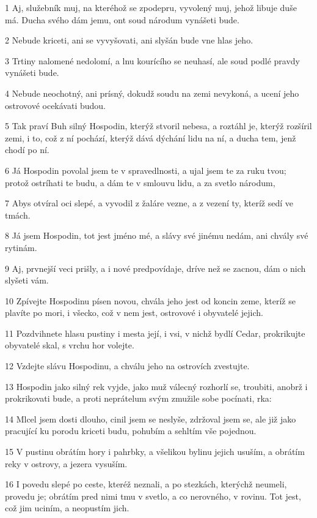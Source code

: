 \par 1 Aj, služebník muj, na kteréhož se zpodepru, vyvolený muj, jehož libuje duše má. Ducha svého dám jemu, ont soud národum vynášeti bude.
\par 2 Nebude kriceti, ani se vyvyšovati, ani slyšán bude vne hlas jeho.
\par 3 Trtiny nalomené nedolomí, a lnu kourícího se neuhasí, ale soud podlé pravdy vynášeti bude.
\par 4 Nebude neochotný, ani prísný, dokudž soudu na zemi nevykoná, a ucení jeho ostrovové ocekávati budou.
\par 5 Tak praví Buh silný Hospodin, kterýž stvoril nebesa, a roztáhl je, kterýž rozšíril zemi, i to, což z ní pochází, kterýž dává dýchání lidu na ní, a ducha tem, jenž chodí po ní.
\par 6 Já Hospodin povolal jsem te v spravedlnosti, a ujal jsem te za ruku tvou; protož ostríhati te budu, a dám te v smlouvu lidu, a za svetlo národum,
\par 7 Abys otvíral oci slepé, a vyvodil z žaláre vezne, a z vezení ty, kteríž sedí ve tmách.
\par 8 Já jsem Hospodin, tot jest jméno mé, a slávy své jinému nedám, ani chvály své rytinám.
\par 9 Aj, prvnejší veci prišly, a i nové predpovídaje, dríve než se zacnou, dám o nich slyšeti vám.
\par 10 Zpívejte Hospodinu písen novou, chvála jeho jest od koncin zeme, kteríž se plavíte po mori, i všecko, což v nem jest, ostrovové i obyvatelé jejich.
\par 11 Pozdvihnete hlasu pustiny i mesta její, i vsi, v nichž bydlí Cedar, prokrikujte obyvatelé skal, s vrchu hor volejte.
\par 12 Vzdejte slávu Hospodinu, a chválu jeho na ostrovích zvestujte.
\par 13 Hospodin jako silný rek vyjde, jako muž válecný rozhorlí se, troubiti, anobrž i prokrikovati bude, a proti neprátelum svým zmužile sobe pocínati, rka:
\par 14 Mlcel jsem dosti dlouho, cinil jsem se neslyše, zdržoval jsem se, ale již jako pracující ku porodu kriceti budu, pohubím a sehltím vše pojednou.
\par 15 V pustinu obrátím hory i pahrbky, a všelikou bylinu jejich usuším, a obrátím reky v ostrovy, a jezera vysuším.
\par 16 I povedu slepé po ceste, kteréž neznali, a po stezkách, kterýchž neumeli, provedu je; obrátím pred nimi tmu v svetlo, a co nerovného, v rovinu. Tot jest, což jim uciním, a neopustím jich.
